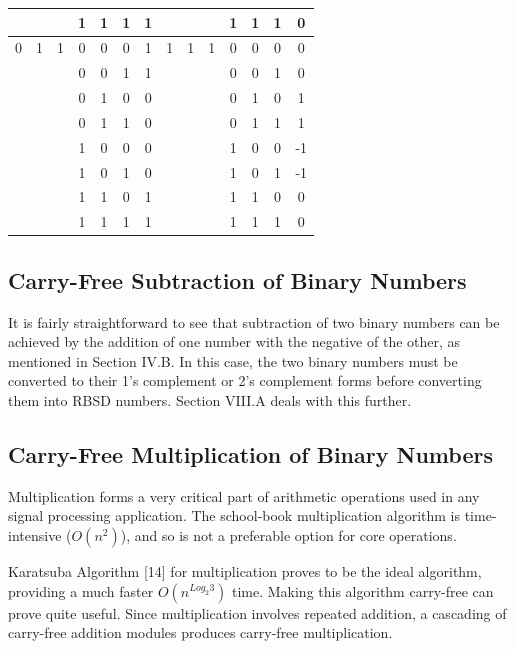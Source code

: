 \documentclass[conference]{IEEEtran}
\begin{document}
\begin{table}[h!]
\begin{tabular}{|c|c|c|c|c|c||c|||c|c|c|c|c|c||c|}
    \hline
    & & & 1 & 1 & 1 & 1  &  & & & 1 & 1 & 1 & 0 \\
    \hline
    0 & 1 & 1 & 0 & 0 & 0 & 1  &  1 & 1 & 1 & 0 & 0 & 0 & 0 \\
    \hline
    & & & 0 & 0 & 1 & 1  &  & & & 0 & 0 & 1 & 0 \\
    \hline
    & & & 0 & 1 & 0 & 0  &  & & & 0 & 1 & 0 & 1 \\
    \hline
    & & & 0 & 1 & 1 & 0  &  & & & 0 & 1 & 1 & 1 \\
    \hline
    & & & 1 & 0 & 0 & 0  &  & & & 1 & 0 & 0 & -1 \\
    \hline
    & & & 1 & 0 & 1 & 0  &  & & & 1 & 0 & 1 & -1 \\
    \hline
    & & & 1 & 1 & 0 & 1  &  & & & 1 & 1 & 0 & 0 \\
    \hline
    & & & 1 & 1 & 1 & 1  &  & & & 1 & 1 & 1 & 0 \\
    \hline
  \end{tabular}
\end{table}

\subsection{Carry-Free Subtraction of Binary Numbers}

It is fairly straightforward to see that subtraction of two binary numbers can be achieved by the addition of one number with the negative of the other, as mentioned in Section IV.B. In this case, the two binary numbers must be converted to their 1’s complement or 2’s complement forms before converting them into RBSD numbers. Section VIII.A deals with this further.

\subsection{Carry-Free Multiplication of Binary Numbers}

Multiplication forms a very critical part of arithmetic operations used in any signal processing application. The school-book multiplication algorithm is time-intensive ($O(n^{2})$), and so is not a preferable option for core operations.

Karatsuba Algorithm [14] for multiplication proves to be the ideal algorithm, providing a much faster $O(n^{Log_{2}3})$ time. Making this algorithm carry-free can prove quite useful. Since multiplication involves repeated addition, a cascading of carry-free addition modules produces carry-free multiplication.
\end{document}

